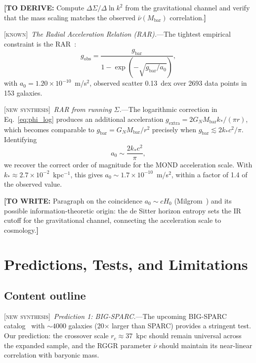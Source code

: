 \documentclass[prl,twocolumn,superscriptaddress,longbibliography,floatfix]{revtex4-2}
\newcommand{\known}{\textsc{[known]}}
\newcommand{\newsyn}{\textsc{[new synthesis]}}
\newcommand{\towrite}[1]{{\color{blue}\textbf{[TO WRITE:} #1\textbf{]}}}
\newcommand{\toderive}[1]{{\color{red}\textbf{[TO DERIVE:} #1\textbf{]}}}
\begin{document}
\toderive{Compute $\Delta\Sigma/\Delta\ln k^2$ from the
gravitational channel and verify that the mass scaling matches
the observed $\bar{\nu}(M_{\mathrm{bar}})$ correlation.}

\known\ \emph{The Radial Acceleration Relation (RAR).}---The
tightest empirical constraint is the RAR~\cite{McGaugh2016}:
\begin{equation}
g_{\mathrm{obs}} = \frac{g_{\mathrm{bar}}}{1 - \exp\!\left(
  -\sqrt{g_{\mathrm{bar}}/a_0}\right)},
\label{eq:RAR}
\end{equation}
with $a_0 = 1.20 \times 10^{-10}$~m/s$^2$, observed scatter
0.13~dex over 2693 data points in 153 galaxies.

\newsyn\ \emph{RAR from running $\Sigma$.}---The logarithmic
correction in Eq.~\eqref{eq:phi_log} produces an additional
acceleration $g_{\mathrm{extra}} = 2G_N M_{\mathrm{bar}}k_*/(\pi r)$,
which becomes comparable to $g_{\mathrm{bar}} = G_N M_{\mathrm{bar}}/r^2$
precisely when $g_{\mathrm{bar}} \lesssim 2k_* c^2/\pi$.
Identifying
\begin{equation}
a_0 \sim \frac{2k_* c^2}{\pi},
\label{eq:a0_kstar}
\end{equation}
we recover the correct order of magnitude for the MOND
acceleration scale. With $k_* \approx 2.7 \times 10^{-2}$~kpc$^{-1}$,
this gives $a_0 \sim 1.7 \times 10^{-10}$~m/s$^2$, within a
factor of 1.4 of the observed value.

\towrite{Paragraph on the coincidence $a_0 \sim cH_0$
(Milgrom~\cite{Milgrom2020}) and its possible information-theoretic
origin: the de Sitter horizon entropy sets the IR cutoff for the
gravitational channel, connecting the acceleration scale to
cosmology.}

\section{Predictions, Tests, and Limitations}
\label{sec:predictions}

\subsection*{Content outline}

\newsyn\ \emph{Prediction 1: BIG-SPARC.}---The upcoming BIG-SPARC
catalog~\cite{BIGSPARC2024} with $\sim 4000$ galaxies (20$\times$
larger than SPARC) provides a stringent test. Our prediction:
the crossover scale $r_c \approx 37$~kpc should remain universal
across the expanded sample, and the RGGR parameter $\bar{\nu}$
should maintain its near-linear correlation with baryonic mass.
\end{document}
